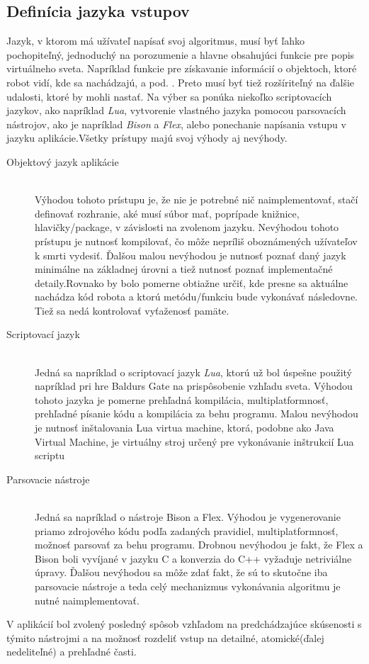 \subsection{ Definícia jazyka vstupov }
Jazyk, v ktorom má užívateľ napísať svoj algoritmus, musí byť ľahko pochopiteľný, jednoduchý na porozumenie a hlavne obsahujúci funkcie pre popis virtuálneho sveta. Napríklad funkcie pre získavanie informácií o objektoch, ktoré robot vidí, kde sa nachádzajú, a pod. . Preto musí byť tiež rozšíriteľný na ďalšie udalosti, ktoré by mohli nastať. Na výber sa ponúka niekoľko scriptovacích jazykov, ako napríklad \emph{Lua}, vytvorenie vlastného jazyka pomocou parsovacích nástrojov, ako je napríklad \emph{Bison} a \emph{Flex}, alebo ponechanie napísania vstupu v jazyku aplikácie.Všetky prístupy majú svoj výhody aj nevýhody.
\begin{description}
	\item[Objektový jazyk aplikácie]\hfill \\ Výhodou tohoto prístupu je, že nie je potrebné nič naimplementovať, stačí definovať rozhranie, aké musí súbor mať, poprípade knižnice, hlavičky/package, v závislosti na zvolenom jazyku. Nevýhodou tohoto prístupu je nutnosť kompilovať, čo môže nepríliš oboznámených užívateľov k smrti vydesiť. Ďalšou malou nevýhodou je nutnosť poznať daný jazyk minimálne na základnej úrovni a tiež nutnosť poznať implementačné detaily.Rovnako by bolo pomerne obtiažne určiť, kde presne sa aktuálne nachádza kód robota a ktorú metódu/funkciu bude vykonávať následovne. Tiež sa nedá kontrolovať vyťaženosť pamäte.
	\item[Scriptovací jazyk]\hfill \\ Jedná sa napríklad o scriptovací jazyk \emph{Lua}, ktorú už bol úspešne použitý napríklad pri hre Baldurs Gate na prispôsobenie vzhľadu sveta. Výhodou tohoto jazyka je pomerne prehľadná kompilácia, multiplatformnosť, prehľadné písanie kódu a kompilácia za behu programu. Malou nevýhodou je nutnosť inštalovania Lua virtua machine, ktorá, podobne ako Java Virtual Machine, je virtuálny stroj určený pre vykonávanie inštrukcií Lua scriptu
	\item[Parsovacie nástroje]\hfill \\ Jedná sa napríklad o nástroje Bison a Flex. Výhodou je vygenerovanie priamo zdrojového kódu podľa zadaných pravidiel, multiplatformnosť, možnosť parsovať za behu programu. Drobnou nevýhodou je fakt, že Flex a Bison boli vyvíjané v jazyku C a konverzia do C++ vyžaduje netriviálne úpravy. Ďalšou nevýhodou sa môže zdať fakt, že sú to skutočne iba parsovacie nástroje a teda celý mechanizmus vykonávania algoritmu je nutné naimplementovať.
\end{description}
V aplikácií bol zvolený posledný spôsob vzhľadom na predchádzajúce skúsenosti s týmito nástrojmi a na možnosť rozdeliť vstup na detailné, atomické(ďalej nedeliteľné) a prehľadné časti.

